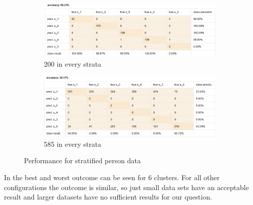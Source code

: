 \begin{figure}[H]
\centering
\begin{subfigure}{0.9\textwidth}
\includegraphics[width = \linewidth]{Dec200eqPrec.PNG}
\caption{200 in every strata}
\label{fig:decvec200}
\end{subfigure}
\begin{subfigure}{0.9\textwidth}
\includegraphics[width= \linewidth]{decvec585pre.PNG}
\caption{585 in every strata}
\label{fig:DecVec585}
\end{subfigure}
\caption{Performance for stratified person data}
\label{fig:DecVec}
\end{figure}

In  the best and worst outcome can be seen for 6 clusters. For all other configurations the outcome is similar, so just small data sets have an acceptable result and larger datasets have no sufficient results for our question.\\
